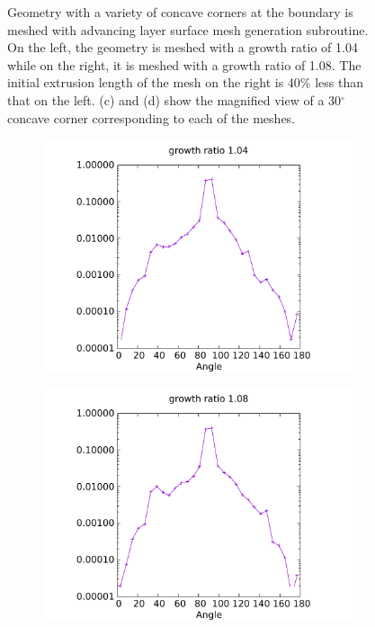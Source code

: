 \documentclass[conf]{new-aiaa}
\begin{document}
\begin{figure}
\begin{subfigure}{0.4\textwidth}
\caption{}
\label{fig-variousAngle-corner-high}
\end{subfigure}
\caption{Geometry with a variety of concave corners at the boundary is meshed with advancing layer surface mesh generation subroutine. On the left, the geometry is meshed with a growth ratio of 1.04 while on the right, it is meshed with a growth ratio of 1.08. The initial extrusion length of the mesh on the right is 40\% less than that on the left. (c) and (d) show the magnified view of a 30$^\circ$ concave corner corresponding to each of the meshes.}
\label{fig-variousAngle}
\end{figure}

\begin{figure}
\centering
\begin{subfigure}{0.5\textwidth}
\centering
\includegraphics[width=0.9\linewidth]{meshCases/variousAngle-x0.5-g1.04/angleDistribution.pdf}
\caption{}
\label{fig-va-dist-low}
\end{subfigure}%
\begin{subfigure}{0.5\textwidth}
\centering
\includegraphics[width = 0.9\linewidth]{meshCases/variousAngle-x0.3-g1.08/angleDistribution.pdf}

\end{subfigure}
\end{figure}
\end{document}
